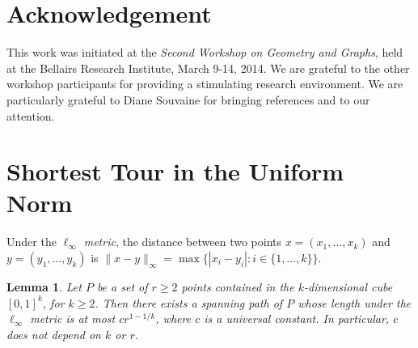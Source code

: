 \documentclass[11pt]{patmorin}
\newtheorem{lemma}[theorem]{Lemma}
\begin{document}
\section*{Acknowledgement}

This work was initiated at the \emph{Second Workshop on Geometry and
Graphs}, held at the Bellairs Research Institute, March 9-14, 2014.
We are grateful to the other workshop participants for providing a
stimulating research environment.  We are particularly grateful to
Diane Souvaine for bringing references \cite{aronov.seidel.ea:on} and
\cite{babikov.souvaine.ea:constructing} to our attention.






\appendix
\newpage
\section{Shortest Tour in the Uniform Norm}
\label{app:uniform-norm}

Under the \emph{$\ell_\infty$ metric}, the distance between two points $x=(x_1,\ldots,x_k)$ and $y=(y_1,\ldots,y_k)$ is $\|x-y\|_\infty = \max\{|x_i-y_i|:i\in\{1,\ldots,k\}\}$.  

\begin{lemma}\label{lemma:tsp}
  Let $P$ be a set of $r\ge 2$ points contained in the $k$-dimensional
  cube $[0,1]^k$, for $k\ge 2$.  Then there exists a spanning path of $P$
  whose length under the $\ell_\infty$ metric is at most $cr^{1-1/k}$,
  where $c$ is a universal constant. In particular, $c$ does not depend
  on $k$ or $r$.
\end{lemma}
\end{document}
